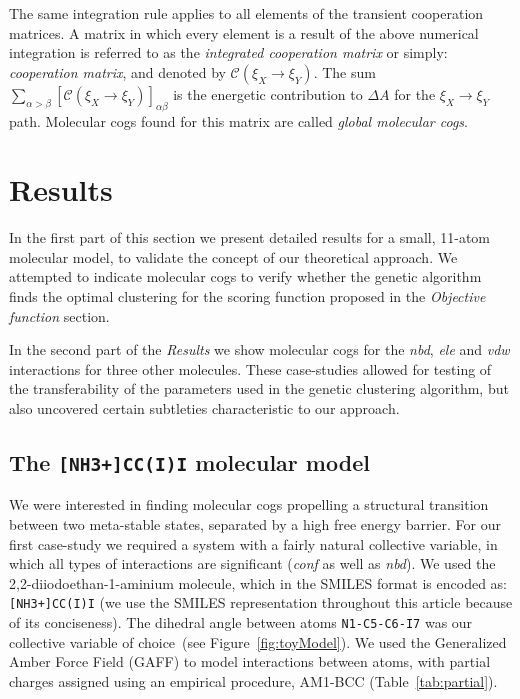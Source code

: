 \documentclass[a4paper,11pt,twoside]{book}%
\begin{document}
The same integration rule applies to all elements of the transient cooperation matrices.
A matrix in which every element is a result of the above numerical integration is referred to as the \emph{integrated cooperation matrix} or simply: \emph{cooperation matrix}, and denoted by $\mathcal{C}(\xi_X\to\xi_Y)$.
The sum \mbox{$\sum_{\alpha>\beta}[\mathcal{C}(\xi_X\to\xi_Y)]_{\alpha\beta}$} is the energetic contribution to $\Delta A$ for the $\xi_X\to\xi_Y$ path.
Molecular cogs found for this matrix are called \emph{global molecular cogs}.


\section{Results}

{\color{black}In the first part of this section} we present {\color{black}detailed} results for a small, 11-atom molecular model, to validate the concept of our theoretical approach.
We attempted to indicate molecular cogs to verify whether the genetic algorithm finds the optimal clustering for the scoring function proposed in the \emph{Objective function} section.

{\color{black}
In the second part of the \emph{Results} we show molecular cogs for the \emph{nbd}, \emph{ele} and \emph{vdw} interactions for three other molecules.
These case-studies allowed for testing of the transferability of the parameters used in the genetic clustering algorithm, but also uncovered certain subtleties characteristic to our approach.
}

\subsection{The \texttt{[NH3+]CC(I)I} molecular model}\label{sec:toy}
We were interested in finding molecular cogs propelling {\color{black}a structural} transition between two meta-stable states, separated by a high free energy barrier.
{\color{black}For our first case-study we required} a system with a fairly natural collective variable, in which all types of interactions are significant (\emph{conf} as well as \emph{nbd}).
We used the {\color{black}2,2-diiodoethan-1-aminium} molecule, {\color{black}which in the SMILES format is encoded as:} \texttt{[NH3+]CC(I)I} {\color{black}(we use the SMILES representation throughout this article because of its conciseness)}.
The dihedral angle between atoms \texttt{N1-C5-C6-I7} {\color{black}was} our collective variable of choice~(see Figure~\ref{fig:toyModel}).
We used the Generalized Amber Force Field (GAFF) to model interactions between atoms, with partial charges assigned using an empirical procedure, AM1-BCC (Table~\ref{tab:partial}).
\end{document}
